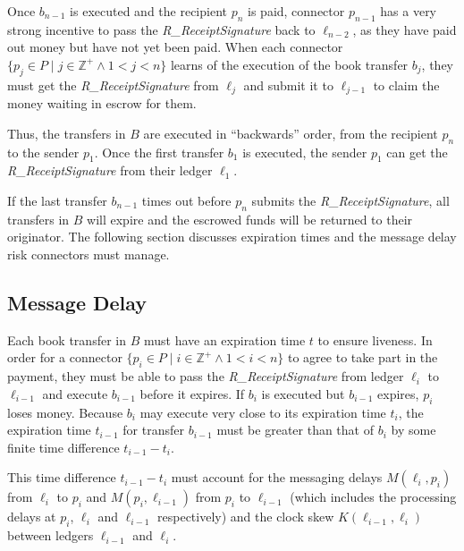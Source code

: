 \documentclass[letterpaper,twocolumn,10pt]{article}
\begin{document}
Once $b_{n-1}$ is executed and the recipient $p_n$ is paid, connector $p_{n-1}$ has a very strong incentive to pass the \textit{R\_ReceiptSignature} back to $\ell_{n-2}$, as they have paid out money but have not yet been paid. When each connector $ \{ p_j \in P \mid j \in \mathbb{Z}^+ \land 1 < j < n \} $ learns of the execution of the book transfer $b_j$, they must get the \textit{R\_ReceiptSignature} from $\ell_j$ and submit it to $\ell_{j-1}$ to claim the money waiting in escrow for them. 

Thus, the transfers in $B$ are executed in ``backwards'' order, from the recipient $p_n$ to the sender $p_1$. Once the first transfer $b_1$ is executed, the sender $p_1$ can get the \textit{R\_ReceiptSignature} from their ledger $\ell_1$.

If the last transfer $b_{n-1}$ times out before $p_n$ submits the \textit{R\_ReceiptSignature}, all transfers in $B$ will expire and the escrowed funds will be returned to their originator. The following section discusses expiration times and the message delay risk connectors must manage.


\subsection{Message Delay}
\label{subsec:message-delay}



Each book transfer in $B$ must have an expiration time $t$ to ensure liveness. In order for a connector $ \{ p_i \in P \mid i \in \mathbb{Z}^+ \land 1 < i < n \} $ to agree to take part in the payment, they must be able to pass the \textit{R\_ReceiptSignature} from ledger $\ell_i$ to $\ell_{i-1}$ and execute $b_{i-1}$ before it expires. If $b_i$ is executed but $b_{i-1}$ expires, $p_i$ loses money. Because $b_i$ may execute very close to its expiration time $t_i$, the expiration time $t_{i-1}$ for transfer $b_{i-1}$ must be greater than that of $b_i$ by some finite time difference $t_{i-1} - t_i$.

This time difference $t_{i-1} - t_i$ must account for the messaging delays $M(\ell_i, p_i)$ from $\ell_i$ to $p_i$ and $M(p_i, \ell_{i-1})$ from $p_i$ to $\ell_{i-1}$ (which includes the processing delays at $p_i$, $\ell_i$ and $\ell_{i-1}$ respectively) and the clock skew $K(\ell_{i-1}, \ell_i)$ between ledgers $\ell_{i-1}$ and $\ell_i$.
\end{document}
